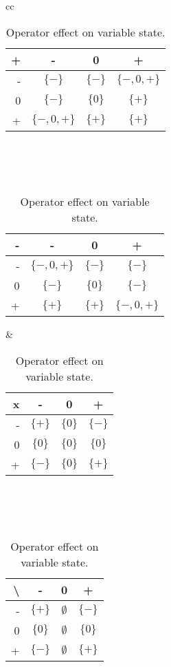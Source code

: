 \begin{table}
\begin{tabular}{cc}
    \begin{minipage}{0.4\linewidth}
		\begin{tabular}{| r | c | c | c |}
		\hline
		 \textbf{+}   & -           & 0 & + \\
		\hline
		 -  & $\{-\}$     & $\{-\}$ & $\{-,0,+\}$ \\
		\hline
		 0  & $\{-\}$     & $\{0\}$ & $\{+\}$ \\
		\hline
		 +  & $\{-,0,+\}$ & $\{+\}$ & $\{+\}$ \\
		\hline
		\end{tabular}
		\\\\\\
		\begin{tabular}{| r | c | c | c |}
		\hline
		  \textbf{-}  & -           & 0 & + \\
		\hline
		 -  & $\{-,0,+\}$ & $\{-\}$ & $\{-\}$ \\
		\hline
		 0  & $\{-\}$     & $\{0\}$ & $\{-\}$ \\
		\hline
		 +  & $\{+\}$     & $\{+\}$ & $\{-,0,+\}$ \\
		\hline
		\end{tabular}
    \end{minipage} &

    \begin{minipage}{0.4\linewidth}
		\begin{tabular}{| r | c | c | c |}
		\hline
		 \textbf{x}   & -           & 0 & + \\
		\hline
		 -  & $\{+\}$ & $\{0\}$ & $\{-\}$ \\
		\hline
		 0  & $\{0\}$ & $\{0\}$ & $\{0\}$ \\
		\hline
		 +  & $\{-\}$ & $\{0\}$ & $\{+\}$ \\
		\hline
		\end{tabular}
		\\\\\\
		\begin{tabular}{| r | c | c | c |}
		\hline
		 \textbf{\textbackslash}   & -           & 0 & + \\
		\hline
		 -  & $\{+\}$ & $\emptyset$ & $\{-\}$ \\
		\hline
		 0  & $\{0\}$ & $\emptyset$ & $\{0\}$ \\
		\hline
		 +  & $\{-\}$ & $\emptyset$ & $\{+\}$ \\
		\hline
		\end{tabular}
    \end{minipage}
\end{tabular}
\centering
\caption{Operator effect on variable state.}
\label{table:arithmetic_operators}
\end{table}

